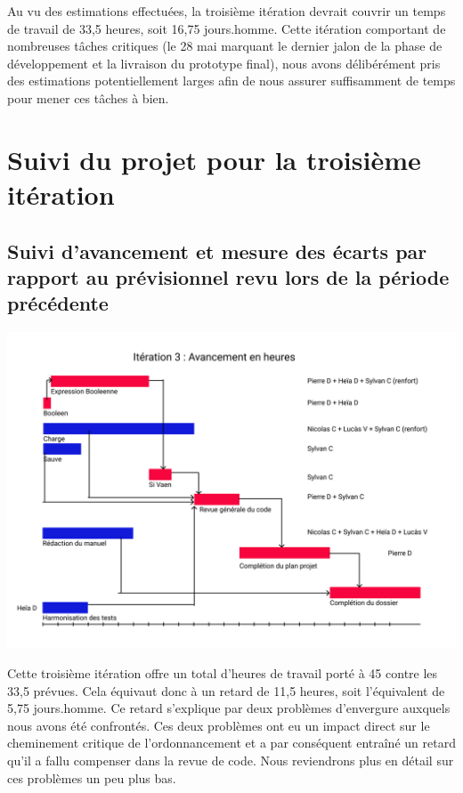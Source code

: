 \documentclass[12pt,a4paper,titlepage,openany, oneside]{report}
\begin{document}
    Au vu des estimations effectuées, la troisième itération devrait couvrir un temps
    de travail de 33,5 heures, soit 16,75 jours.homme. Cette itération comportant de
    nombreuses tâches critiques (le 28 mai marquant le dernier jalon de la phase de
    développement et la livraison du prototype final), nous avons délibérément pris des estimations potentiellement larges
    afin de nous assurer suffisamment de temps pour mener ces tâches à bien.

    \section{Suivi du projet pour la troisième itération}

    \subsection{Suivi d’avancement et mesure des écarts par rapport au prévisionnel revu lors de la période précédente}

    \includegraphics[scale=0.75]{fichiers/planification/iteration3/iteration3Avancement.png}

    Cette troisième itération offre un total d'heures de travail porté à 45 contre les
    33,5 prévues. Cela équivaut donc à un retard de 11,5 heures, soit l'équivalent de
    5,75 jours.homme. Ce retard s'explique par deux problèmes d'envergure auxquels
    nous avons été confrontés. Ces deux problèmes ont eu un impact direct sur le
    cheminement critique de l'ordonnancement et a par conséquent entraîné un retard qu'il a fallu compenser dans la revue de code. Nous reviendrons plus en détail sur ces
    problèmes un peu plus bas.
\end{document}
